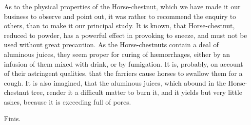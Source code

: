 \documentclass[a4paper, 11pt, oneside, polutonikogreek, english]{article}
\begin{document}
As to the physical properties of the Horse-chestnut, which we have made it our business to observe and point out, it was rather to recommend the enquiry to others, than to make it our principal study. It is known, that Horse-chestnut, reduced to powder, has a powerful effect in provoking to sneeze, and must not be used without great precaution. As the Horse-chestnuts contain a deal of aluminous juices, they seem proper for curing of hæmorrhages, either by an infusion of them mixed with drink, or by fumigation. It is, probably, on account of their astringent qualities, that the farriers cause horses to swallow them for a cough. It is also imagined, that the aluminous juices, which abound in the Horse-chestnut tree, render it a difficult matter to burn it, and it yields but very little ashes, because it is exceeding full of pores.
\begin{center}
Finis.
\end{center}
\end{document}
